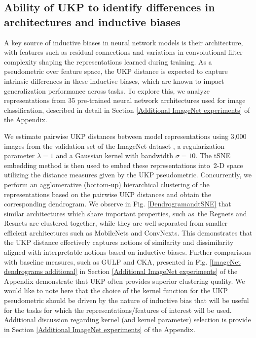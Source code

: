 \documentclass[11pt]{article}
\newcommand{\metricstname}{UKP }
\theoremstyle{plain}
\begin{document}
\subsection{Ability of \metricstname to identify differences in architectures and inductive biases} \label{ImageNet experiments experiments}
 A key source of inductive biases in neural network models is their architecture, with features such as residual connections and variations in convolutional filter complexity shaping the representations learned during training. As a pseudometric over feature space, the \metricstname distance is expected to capture intrinsic differences in these inductive biases, which are known to impact generalization performance across tasks. To explore this, we analyze representations from 35 pre-trained neural network architectures used for image classification, described in detail in Section \ref{Additional ImageNet experiments} of the Appendix.

 We estimate pairwise \metricstname distances between model representations using 3,000 images from the validation set of the ImageNet dataset \cite{krizhevsky2012imagenet}, a regularization parameter $\lambda=1$ and a Gaussian kernel with bandwidth $\sigma=10$. The tSNE embedding method is then used to embed these representations into 2-D space utilizing the distance measures given by the \metricstname pseudometric. Concurrently, we perform an agglomerative (bottom-up) hierarchical clustering of the representations based on the pairwise \metricstname distances and obtain the corresponding dendrogram. We observe in Fig. \ref{DendrogramandtSNE} that similar architectures which share important properties, such as the Regnets and Resnets are clustered together, while they are well separated from smaller efficient architectures such as MobileNets and ConvNexts. This demonstrates that the \metricstname distance effectively captures notions of similarity and dissimilarity aligned with interpretable notions based on inductive biases. Further comparisons with baseline measures, such as GULP and CKA, presented in Fig. \ref{ImageNet dendrograms additional} in Section \ref{Additional ImageNet experiments} of the Appendix demonstrate that \metricstname often provides superior clustering quality. We would like to note here that the choice of the kernel function for the \metricstname pseudometric should be driven by the nature of inductive bias that will be useful for the tasks for which the representations/features of interest will be used. Additional discussion regarding kernel (and kernel parameter) selection is provide in Section \ref{Additional ImageNet experiments} of the Appendix.
\end{document}
